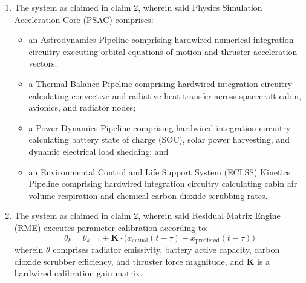 \documentclass[12pt,a4paper]{article}
\begin{document}
\begin{enumerate}
    \item The system as claimed in claim 2, wherein said Physics Simulation Acceleration Core (PSAC) comprises:
    \begin{itemize}
        \item an Astrodynamics Pipeline comprising hardwired numerical integration circuitry executing orbital equations of motion and thruster acceleration vectors;
        \item a Thermal Balance Pipeline comprising hardwired integration circuitry calculating convective and radiative heat transfer across spacecraft cabin, avionics, and radiator nodes;
        \item a Power Dynamics Pipeline comprising hardwired integration circuitry calculating battery state of charge (SOC), solar power harvesting, and dynamic electrical load shedding; and
        \item an Environmental Control and Life Support System (ECLSS) Kinetics Pipeline comprising hardwired integration circuitry calculating cabin air volume respiration and chemical carbon dioxide scrubbing rates.
    \end{itemize}

    \item The system as claimed in claim 2, wherein said Residual Matrix Engine (RME) executes parameter calibration according to:
    \begin{equation*}
        \theta_k = \theta_{k-1} + \mathbf{K} \cdot \bigl(x_{\text{actual}}(t-\tau) - x_{\text{predicted}}(t-\tau)\bigr)
    \end{equation*}
    wherein $\theta$ comprises radiator emissivity, battery active capacity, carbon dioxide scrubber efficiency, and thruster force magnitude, and $\mathbf{K}$ is a hardwired calibration gain matrix.


\end{enumerate}
\end{document}
